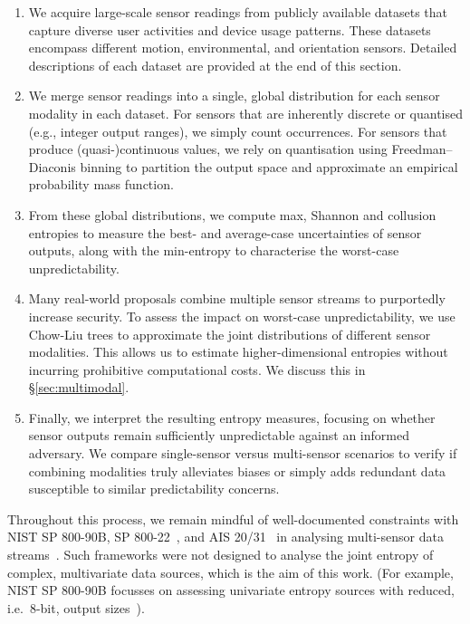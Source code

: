 \begin{enumerate}
    \item We acquire large-scale sensor readings from publicly available datasets that capture diverse user activities and device usage patterns. These datasets encompass different motion, environmental, and orientation sensors. Detailed descriptions of each dataset are provided at the end of this section.
    \item We merge sensor readings into a single, global distribution for each sensor modality in each dataset. For sensors that are inherently discrete or quantised (e.g., integer output ranges), we simply count occurrences. For sensors that produce (quasi-)continuous values, we rely on quantisation using Freedman–Diaconis binning to partition the output space and approximate an empirical probability mass function.
    \item From these global distributions, we compute max, Shannon and collusion entropies to measure the best- and average-case uncertainties of sensor outputs, along with the min-entropy to characterise the worst-case unpredictability.
    \item Many real-world proposals combine multiple sensor streams to purportedly increase security. To assess the impact on worst-case unpredictability, we use Chow-Liu trees to approximate the joint distributions of different sensor modalities. This allows us to estimate higher-dimensional entropies without incurring prohibitive computational costs. We discuss this in \S\ref{sec:multimodal}.
    \item Finally, we interpret the resulting entropy measures, focusing on whether sensor outputs remain sufficiently unpredictable against an informed adversary. We compare single-sensor versus multi-sensor scenarios to verify if combining modalities truly alleviates biases or simply adds redundant data susceptible to similar predictability concerns.

\end{enumerate}

Throughout this process, we remain mindful of well-documented constraints with NIST SP 800-90B, SP 800-22~\cite{turan2018recommendation}, and AIS 20/31~\cite{bsi2024ais31} in analysing multi-sensor data streams~\cite{buller2016estimating,lv2020analysis}. Such  frameworks were not designed to analyse the joint entropy of complex, multivariate data sources, which is the aim of this work. (For example, NIST SP 800-90B focusses on assessing univariate entropy sources with reduced, i.e.\ 8-bit, output sizes~\cite{buller2016estimating,turan2018recommendation}).